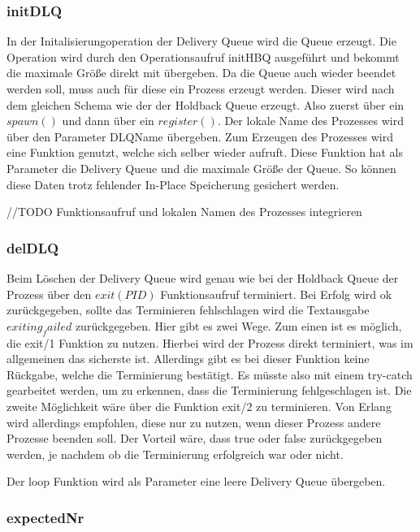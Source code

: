 \subsubsection{initDLQ}

In der Initalisierungoperation der Delivery Queue wird die Queue erzeugt. Die Operation wird durch den Operationsaufruf initHBQ ausgeführt und bekommt die maximale Größe direkt mit übergeben. 
Da die Queue auch wieder beendet werden soll, muss auch für diese ein Prozess erzeugt werden. Dieser wird nach dem gleichen Schema wie der der Holdback Queue erzeugt. Also zuerst über ein $spawn()$ und dann über ein $register()$. Der lokale Name des Prozesses wird über den Parameter DLQName übergeben. Zum Erzeugen des Prozesses wird eine Funktion genutzt, welche sich selber wieder aufruft. Diese Funktion hat als Parameter die Delivery Queue und die maximale Größe der Queue. So können diese Daten trotz fehlender In-Place Speicherung gesichert werden. 

//TODO Funktionsaufruf und lokalen Namen des Prozesses integrieren 

\subsubsection{delDLQ}

Beim Löschen der Delivery Queue wird genau wie bei der Holdback Queue der Prozess über den $exit(PID)$ Funktionsaufruf terminiert. Bei Erfolg wird ok zurückgegeben, sollte das Terminieren fehlschlagen wird die Textausgabe $exiting_failed$ zurückgegeben. Hier gibt es zwei Wege. Zum einen ist es möglich, die exit/1 Funktion zu nutzen. Hierbei wird der Prozess direkt terminiert, was im allgemeinen das sicherste ist. Allerdings gibt es bei dieser Funktion keine Rückgabe, welche die Terminierung bestätigt. Es müsste also mit einem try-catch gearbeitet werden, um zu erkennen, dass die Terminierung fehlgeschlagen ist. 
Die zweite Möglichkeit wäre über die Funktion exit/2 zu terminieren. Von Erlang wird allerdings empfohlen, diese nur zu nutzen, wenn dieser Prozess andere Prozesse beenden soll. Der Vorteil wäre, dass true oder false zurückgegeben werden, je nachdem ob die Terminierung erfolgreich war oder nicht. 

Der loop Funktion wird als Parameter eine leere Delivery Queue übergeben. 

\subsubsection{expectedNr}

